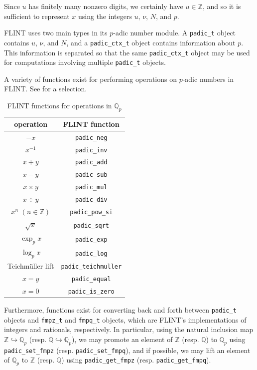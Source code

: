 \documentclass[runningheads]{llncs}
\newcommand{\QQ}{\mathbb Q}
\newcommand{\ZZ}{\mathbb Z}
\begin{document}
Since $u$ has finitely many nonzero digits, we certainly have $u\in\ZZ$, and so it is sufficient to represent $x$ using the integers $u$, $\nu$, $N$, and $p$.

FLINT uses two main types in its $p$-adic number module.  A \texttt{padic\_t} object contains $u$, $\nu$, and $N$, and a \texttt{padic\_ctx\_t} object contains information about $p$.  This information is separated so that the same \texttt{padic\_ctx\_t} object may be used for computations involving multiple \texttt{padic\_t} objects.

A variety of functions exist for performing operations on $p$-adic numbers in FLINT.  See  for a selection.

\begin{table}[htbp!]
  \centering
  \begin{tabular}{|c|c|}
    \hline
    operation & FLINT function \\ \hline\hline
    $-x$ & \texttt{padic\_neg} \\
    $x^{-1}$ & \texttt{padic\_inv} \\
    $x+y$ & \texttt{padic\_add} \\
    $x-y$ & \texttt{padic\_sub} \\
    $x\times y$ & \texttt{padic\_mul} \\
    $x\div y$ & \texttt{padic\_div} \\
    $x^n$ $(n\in\ZZ)$ & \texttt{padic\_pow\_si} \\
    $\sqrt x$ & \texttt{padic\_sqrt} \\
    $\exp_p x$ & \texttt{padic\_exp} \\
    $\log_p x$ & \texttt{padic\_log} \\
    Teichm\"uller lift & \texttt{padic\_teichmuller} \\
    $x = y$ & \texttt{padic\_equal} \\
    $x = 0$ & \texttt{padic\_is\_zero} \\
    \hline
  \end{tabular}
  \vspace{1em}
  \caption{FLINT functions for operations in $\QQ_p$}
  \label{flint p-adic functions}
\end{table}

Furthermore, functions exist for converting back and forth between \texttt{padic\_t} objects and \texttt{fmpz\_t} and \texttt{fmpq\_t} objects, which are FLINT's implementations of integers and rationals, respectively.  In particular, using the natural inclusion map $\ZZ\hookrightarrow\QQ_p$ (resp. $\QQ\hookrightarrow\QQ_p$), we may promote an element of $\ZZ$ (resp. $\QQ$) to $\QQ_p$ using \texttt{padic\_set\_fmpz} (resp. \texttt{padic\_set\_fmpq}), and if possible, we may lift an element of $\QQ_p$ to $\ZZ$ (resp. $\QQ$) using \texttt{padic\_get\_fmpz} (resp. \texttt{padic\_get\_fmpq}).
\end{document}
